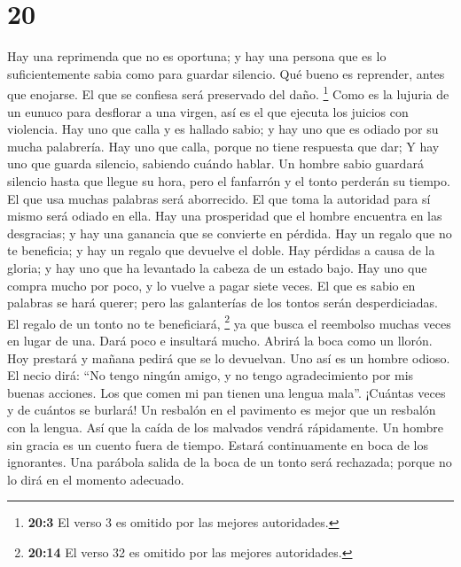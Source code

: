 \hypertarget{section-19}{%
\section{20}\label{section-19}}

 Hay una reprimenda que no es oportuna; y hay una persona
que es lo suficientemente sabia como para guardar silencio.
 Qué bueno es reprender, antes que enojarse. El que se
confiesa será preservado del daño.  \footnote{\textbf{20:3}
  El verso 3 es omitido por las mejores autoridades.} 
Como es la lujuria de un eunuco para desflorar a una virgen, así es el
que ejecuta los juicios con violencia.  Hay uno que calla
y es hallado sabio; y hay uno que es odiado por su mucha palabrería.
 Hay uno que calla, porque no tiene respuesta que dar; Y
hay uno que guarda silencio, sabiendo cuándo hablar.  Un
hombre sabio guardará silencio hasta que llegue su hora, pero el
fanfarrón y el tonto perderán su tiempo.  El que usa
muchas palabras será aborrecido. El que toma la autoridad para sí mismo
será odiado en ella.  Hay una prosperidad que el hombre
encuentra en las desgracias; y hay una ganancia que se convierte en
pérdida.  Hay un regalo que no te beneficia; y hay un
regalo que devuelve el doble.  Hay pérdidas a causa de la
gloria; y hay uno que ha levantado la cabeza de un estado bajo.
 Hay uno que compra mucho por poco, y lo vuelve a pagar
siete veces.  El que es sabio en palabras se hará querer;
pero las galanterías de los tontos serán desperdiciadas. 
El regalo de un tonto no te beneficiará, \footnote{\textbf{20:14} El
  verso 32 es omitido por las mejores autoridades.} ya que busca el
reembolso muchas veces en lugar de una.  Dará poco e
insultará mucho. Abrirá la boca como un llorón. Hoy prestará y mañana
pedirá que se lo devuelvan. Uno así es un hombre odioso. 
El necio dirá: ``No tengo ningún amigo, y no tengo agradecimiento por
mis buenas acciones. Los que comen mi pan tienen una lengua mala''.
 ¡Cuántas veces y de cuántos se burlará! 
Un resbalón en el pavimento es mejor que un resbalón con la lengua. Así
que la caída de los malvados vendrá rápidamente.  Un
hombre sin gracia es un cuento fuera de tiempo. Estará continuamente en
boca de los ignorantes.  Una parábola salida de la boca
de un tonto será rechazada; porque no lo dirá en el momento adecuado.
